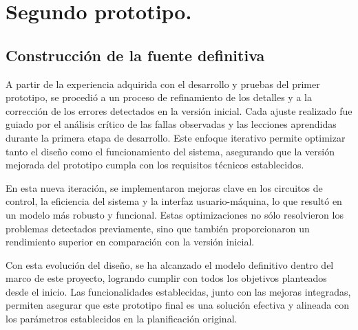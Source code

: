 \chapter{Segundo prototipo.}

\label{C:Construcción de modelo final}

\section{Construcción de la fuente definitiva}

A partir de la experiencia adquirida con el desarrollo y pruebas del primer prototipo, se procedió a un proceso de refinamiento de los detalles y a la corrección de los errores detectados en la versión inicial. Cada ajuste realizado fue guiado por el análisis crítico de las fallas observadas y las lecciones aprendidas durante la primera etapa de desarrollo. Este enfoque iterativo permite optimizar tanto el diseño como el funcionamiento del sistema, asegurando que la versión mejorada del prototipo cumpla con los requisitos técnicos establecidos. \par
En esta nueva iteración, se implementaron mejoras clave en los circuitos de control, la eficiencia del sistema y la interfaz usuario-máquina, lo que resultó en un modelo más robusto y funcional. Estas optimizaciones no sólo resolvieron los problemas detectados previamente, sino que también proporcionaron un rendimiento superior en comparación con la versión inicial.\par
Con esta evolución del diseño, se ha alcanzado el modelo definitivo dentro del marco de este proyecto, logrando cumplir con todos los objetivos planteados desde el inicio. Las funcionalidades establecidas, junto con las mejoras integradas, permiten asegurar que este prototipo final es una solución efectiva y alineada con los parámetros establecidos en la planificación original.\par

